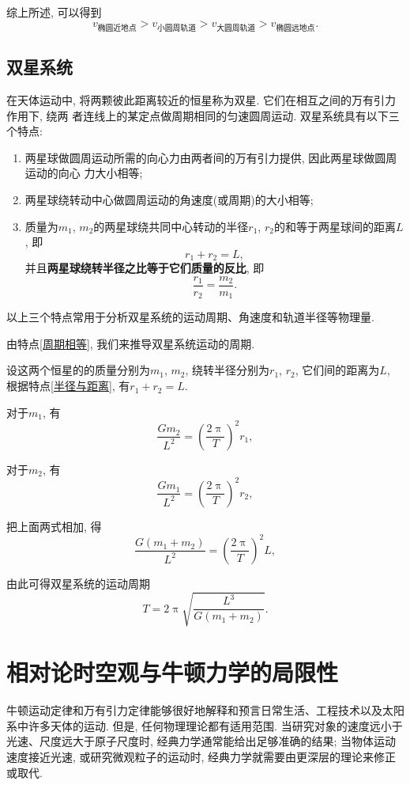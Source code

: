 \documentclass[11pt,a4paper]{ctexbook}
\begin{document}
综上所述, 可以得到
$$v_\text{椭圆近地点} > v_\text{小圆周轨道} > v_\text{大圆周轨道} > v_\text{椭圆远地点}.$$

\subsection{双星系统}

在天体运动中, 将两颗彼此距离较近的恒星称为双星. 它们在相互之间的万有引力作用下, 绕两
者连线上的某定点做周期相同的匀速圆周运动. 双星系统具有以下三个特点:
\begin{enumerate}
	\setlength{\itemsep}{0pt}
	\setlength{\parsep}{0pt}
	\setlength{\parskip}{0pt}
	\item 两星球做圆周运动所需的向心力由两者间的万有引力提供, 因此两星球做圆周运动的向心
	      力大小相等;
	\item 两星球绕转动中心做圆周运动的角速度(或周期)的大小相等;\label{周期相等}
	\item 质量为$m_1$, $m_2$的两星球绕共同中心转动的半径$r_1$, $r_2$的和等于两星球间的距离$L$,
	      即$$r_1 + r_2 = L,$$ 并且\textbf{两星球绕转半径之比等于它们质量的反比}, 即
	      $$\frac{r_1}{r_2} = \frac{m_2}{m_1}.$$ \label{半径与距离}
\end{enumerate}

以上三个特点常用于分析双星系统的运动周期、角速度和轨道半径等物理量.

由特点\ref{周期相等}, 我们来推导双星系统运动的周期.

设这两个恒星的的质量分别为$m_1$, $m_2$, 绕转半径分别为$r_1$, $r_2$, 它们间的距离为$L$, 根据特点\ref{半径与距离},
有$r_1 + r_2 = L$.

对于$m_1$, 有$$\frac{Gm_2}{L^2} = \left(\frac{2\uppi}{T}\right)^2r_1, $$

对于$m_2$, 有$$\frac{Gm_1}{L^2} = \left(\frac{2\uppi}{T}\right)^2r_2, $$

把上面两式相加, 得$$\frac{G(m_1 + m_2)}{L^2} = \left(\frac{2\uppi}{T}\right)^2L, $$

由此可得双星系统的运动周期$$T = 2\uppi \sqrt{\frac{L^3}{G(m_1 + m_2)}}.$$


\section{相对论时空观与牛顿力学的局限性}

牛顿运动定律和万有引力定律能够很好地解释和预言日常生活、工程技术以及太阳系中许多天体的运动.
但是, 任何物理理论都有适用范围. 当研究对象的速度远小于光速、尺度远大于原子尺度时,
经典力学通常能给出足够准确的结果; 当物体运动速度接近光速, 或研究微观粒子的运动时, 经典力学就需要由更深层的理论来修正或取代.
\end{document}

